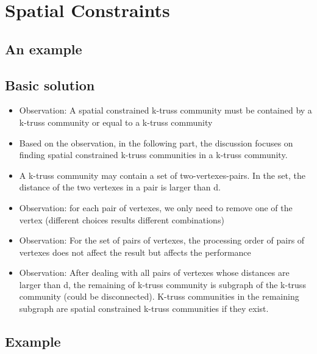 \documentclass{beamer}
\begin{document}
\section{Spatial Constraints}

\subsection{An example}
\begin{frame}
\end{frame}

\subsection{Basic solution}
\begin{frame}
\begin{itemize}
\item Observation: A spatial constrained k-truss community must be contained by a k-truss community or equal to a k-truss community 
\item Based on the observation, in the following part, the discussion focuses on finding spatial constrained k-truss communities in a k-truss community.
\item A k-truss community may contain a set of two-vertexes-pairs. In the set, the distance of the two vertexes in a pair is larger than d.
\item Observation: for each pair of vertexes, we only need to remove one of the vertex (different choices results different combinations)
\item Observation: For the set of pairs of vertexes, the processing order of pairs of vertexes does not affect the result but affects the performance
\item Observation: After dealing with all pairs of vertexes whose distances are larger than d, the remaining of k-truss community is subgraph of the k-truss community (could be disconnected).
K-truss communities in the remaining subgraph are spatial constrained k-truss communities if they exist.
\end{itemize}
\end{frame}

\subsection{Example}
\begin{frame}

\end{frame}
\end{document}

